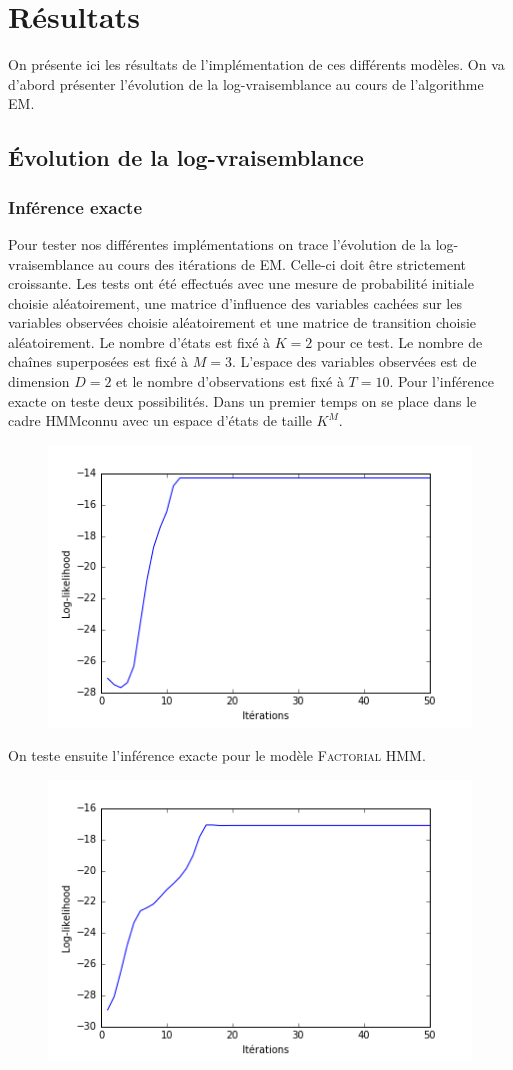 \documentclass[10pt,a4paper]{article}
\newcommand{\hmm}{\textsc{HMM}}
\newcommand{\fhmm}{\textsc{Factorial HMM}}
\newcommand{\EM}{\textsc{EM}}
\begin{document}
\section{Résultats}
On présente ici les résultats de l'implémentation de ces différents modèles. On va d'abord présenter l'évolution de la log-vraisemblance au cours de l'algorithme \EM.
\subsection{Évolution de la log-vraisemblance}
\subsubsection{Inférence exacte}
Pour tester nos différentes implémentations on trace l'évolution de la log-vraisemblance au cours des itérations de \EM. Celle-ci doit être strictement croissante. Les tests ont été effectués avec une mesure de probabilité initiale choisie aléatoirement, une matrice d'influence des variables cachées sur les variables observées choisie aléatoirement et une matrice de transition choisie aléatoirement. Le nombre d'états est fixé à $K = 2$ pour ce test. Le nombre de chaînes superposées est fixé à $M = 3$. L'espace des variables observées est de dimension $D=2$ et le nombre d'observations est fixé à $T=10$. Pour l'inférence exacte on teste deux possibilités. Dans un premier temps on se place dans le cadre \hmm connu avec un espace d'états de taille $K^M$.
\begin{figure}[H]
\centering
\includegraphics[scale=0.5]{M3_K2_hmm.png}
\end{figure}
On teste ensuite l'inférence exacte pour le modèle \fhmm.
\begin{figure}[H]
\centering
\includegraphics[scale=0.5]{M3_K2_fhmm_exact.png}
\end{figure}
\end{document}
